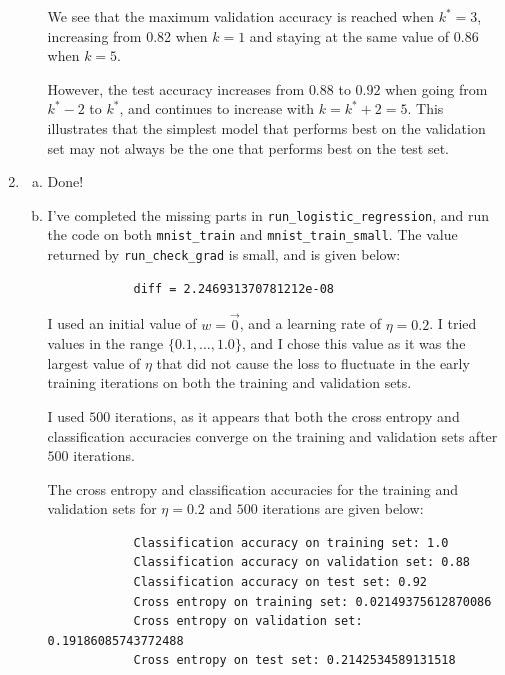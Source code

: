 \documentclass{article}
\begin{document}
\begin{enumerate}[3.1]
\begin{enumerate}[(a)]
        We see that the maximum validation accuracy is reached when $k^* = 3$, increasing from 0.82 when $k = 1$ and staying at the same value of 0.86 when $k = 5$.
        
        However, the test accuracy increases from $0.88$ to $0.92$ when going from $k^* - 2$ to $k^*$, and continues to increase with $k = k^* + 2 = 5$. This illustrates that the simplest model that performs best on the validation set may not always be the one that performs best on the test set. 
    \end{enumerate}
    
    \item \begin{enumerate}[(a)]
        \item Done!
        \item I've completed the missing parts in \texttt{run\_logistic\_regression}, and run the code on both \texttt{mnist\_train} and \texttt{mnist\_train\_small}. The value returned by \texttt{run\_check\_grad} is small, and is given below:
        
        \begin{verbatim}
            diff = 2.246931370781212e-08
        \end{verbatim}

        I used an initial value of $w = \vec{0}$, and a learning rate of $\eta = 0.2$. I tried values in the range $\{0.1, \dots, 1.0\}$, and I chose this value as it was the largest value of $\eta$ that did not cause the loss to fluctuate in the early training iterations on both the training and validation sets. 

        I used $500$ iterations, as it appears that both the cross entropy and classification accuracies converge on the training and validation sets after $500$ iterations.

        The cross entropy and classification accuracies for the training and validation sets for $\eta = 0.2$ and $500$ iterations are given below:

        \begin{verbatim}
            Classification accuracy on training set: 1.0
            Classification accuracy on validation set: 0.88
            Classification accuracy on test set: 0.92
            Cross entropy on training set: 0.02149375612870086
            Cross entropy on validation set: 0.19186085743772488
            Cross entropy on test set: 0.2142534589131518
        \end{verbatim}


\end{enumerate}
\end{enumerate}
\end{document}
